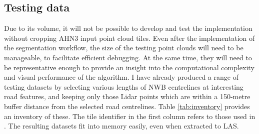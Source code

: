 \subsection{Testing data}
\label{sub:testingdata}

Due to its volume, it will not be possible to develop and test the implementation without cropping AHN3 input point cloud tiles. Even after the implementation of the segmentation workflow, the size of the testing point clouds will need to be manageable, to facilitate efficient debugging. At the same time, they will need to be representative enough to provide an insight into the computational complexity and visual performance of the algorithm. I have already produced a range of testing datasets by selecting various lengths of NWB centrelines at interesting road features, and keeping only those Lidar points which are within a 150-metre buffer distance from the selected road centrelines. Table \ref{tab:inventory} provides an inventory of these. The tile identifier in the first column refers to those used in \cite{ahn3_download}. The resulting datasets fit into memory easily, even when extracted to LAS.

